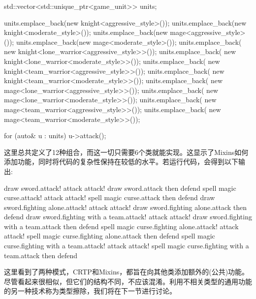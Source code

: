 \begin{cpp}
std::vector<std::unique_ptr<game_unit>> units;

units.emplace_back(new knight<aggressive_style>());
units.emplace_back(new knight<moderate_style>());
units.emplace_back(new mage<aggressive_style>());
units.emplace_back(new mage<moderate_style>());
units.emplace_back(
	new knight<lone_warrior<aggressive_style>>());
units.emplace_back(
	new knight<lone_warrior<moderate_style>>());
units.emplace_back(
	new knight<team_warrior<aggressive_style>>());
units.emplace_back(
	new knight<team_warrior<moderate_style>>());
units.emplace_back(
	new mage<lone_warrior<aggressive_style>>());
units.emplace_back(
	new mage<lone_warrior<moderate_style>>());
units.emplace_back(
	new mage<team_warrior<aggressive_style>>());
units.emplace_back(
	new mage<team_warrior<moderate_style>>());

for (auto& u : units)
	u->attack();
\end{cpp}

这里总共定义了12种组合，而这一切只需要6个类就能实现。这显示了Mixins如何添加功能，同时将代码的复杂性保持在较低的水平。若运行代码，会得到以下输出:

\begin{shell}
draw sword.attack! attack attack!
draw sword.attack then defend
spell magic curse.attack! attack attack!
spell magic curse.attack then defend
draw sword.fighting alone.attack! attack attack!
draw sword.fighting alone.attack then defend
draw sword.fighting with a team.attack! attack attack!
draw sword.fighting with a team.attack then defend
spell magic curse.fighting alone.attack! attack attack!
spell magic curse.fighting alone.attack then defend
spell magic curse.fighting with a team.attack! attack attack!
spell magic curse.fighting with a team.attack then defend
\end{shell}

这里看到了两种模式，CRTP和Mixins，都旨在向其他类添加额外的(公共)功能。尽管看起来很相似，但它们的结构不同，不应该混淆。利用不相关类型的通用功能的另一种技术称为类型擦除，我们将在下一节进行讨论。



































